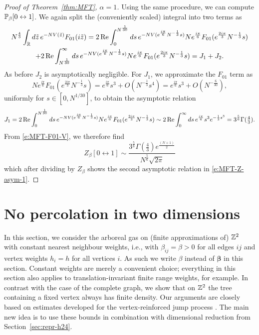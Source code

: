 \documentclass[11pt]{amsart}
\numberwithin{equation}{section}
\numberwithin{theorem}{section}
\newcommand{\V}[1]{\boldsymbol{#1}}
\begin{document}
\begin{proof}[Proof of Theorem~\ref{thm:MFT}, $\alpha=1$]
Using the same procedure, we can compute $\P_\beta[0\leftrightarrow 1]$.
We again split the (conveniently scaled) integral into two terms as
\begin{multline}
  N^{\frac{4}{3}}\int_{\R} d\tilde z\, e^{-NV(\tilde z)} F_{01}(i\tilde z)
  = 2 \re\int_{0}^{N^{\frac{1}{30}}} ds\, e^{-NV(e^{\frac{i\pi}{6}}N^{-\frac{1}{3}}s)} Ne^{\frac{i\pi}{6}}F_{01}(e^{\frac{2i\pi}{3}}N^{-\frac{1}{3}}s)
    \\
  + 2\re\int_{N^{\frac{1}{30}}}^{\infty} ds\, e^{-NV(e^{\frac{i\pi}{6}}N^{-\frac{1}{3}}s)} Ne^{\frac{i\pi}{6}}F_{01}(e^{\frac{2i\pi}{3}}N^{-\frac{1}{3}}s)
  = J_1 + J_2.
\end{multline}
As before $J_2$ is asymptotically negligible. For $J_1$, we approximate the $F_{01}$ term as
\begin{equation}
  Ne^{\frac{i\pi}{6}}F_{01}(e^{\frac{2i\pi}{3}}N^{-\frac{1}{3}}s)
  = e^{\frac{i\pi}{6}}s^3 + O(N^{-\frac{1}{3}}s^4)
  = e^{\frac{i\pi}{6}}s^3 + O(N^{-\frac{6}{30}}),
\end{equation}
uniformly for $s\in [0,N^{1/30}]$, to obtain the asymptotic relation
\begin{equation}
  J_1 = 2\re\int_{0}^{N^{\frac{1}{30}}} ds\, e^{-NV(e^{\frac{i\pi}{6}}N^{-\frac{1}{3}}s)} Ne^{\frac{i\pi}{6}}F_{01}(e^{\frac{2i\pi}{3}}N^{-\frac{1}{3}}s)
  \sim  2\re\int_{0}^{\infty} ds\, e^{\frac{i\pi}{6}}s^3e^{-\frac{1}{3}s^3}
  = 3^{\frac{5}{6}}\Gamma(\tfrac{4}{3}).
\end{equation}
From \eqref{e:MFT-F01-V}, we therefore find
\begin{equation}
Z_\beta[0\leftrightarrow 1] \sim \frac{3^{\frac{5}{6}}\Gamma\left(\frac{4}{3}\right)e^{\frac{(N+1)}{2}}}{N^{\frac{5}{6}}\sqrt{2\pi}}
\end{equation}
which after dividing by $Z_\beta$ shows the second asymptotic relation in \eqref{e:MFT-Z-asym-1}.
\end{proof}



\section{No percolation in two dimensions}
\label{sec:Z2}

In this section, we consider the arboreal gas on (finite approximations of) $\Z^2$ 
with constant nearest neighbour weights, i.e., with
$\beta_{ij}=\beta>0$ for all edges $ij$ and vertex weights $h_i=h$ for
all vertices $i$. As such we write $\beta$ instead of
  $\V{\beta}$ in this section. Constant weights are
merely a convenient choice; everything in this section also applies to
translation-invariant finite range weights, for example.  In contrast
with the case of the complete graph, we show that on $\Z^2$ the tree
containing a fixed vertex always has finite density.  Our arguments
are closely based on estimates developed for the vertex-reinforced
jump process \cite{MR4021254,1907.07949,1911.08579}.
The main new idea is to use these bounds in combination with dimensional reduction
from Section~\ref{sec:repr-h24}.
\end{document}

